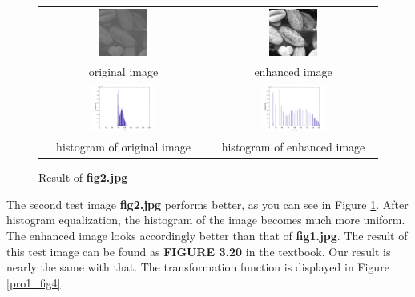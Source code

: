 \documentclass[11pt,a4paper]{article}
\begin{document}
\begin{figure}[!htbp]
	\centering
	\begin{tabular}{cc} 
		\includegraphics[width=0.3\textwidth]{pro1/fig2_origin}&
		\includegraphics[width=0.3\textwidth]{pro1/fig2_enhanced} \\
		original image & enhanced image\\
		\includegraphics[width=0.4\textwidth]{pro1/fig2_originhist} &
		\includegraphics[width=0.4\textwidth]{pro1/fig2_enhancehist}\\
		histogram of original image & histogram of enhanced image
	\end{tabular}
	\caption{Result of \textbf{fig2.jpg}}
	\label{pro1_fig3}
\end{figure}

The second test image \textbf{fig2.jpg} performs better, as you can see in Figure \ref{pro1_fig3}. 
After histogram equalization, the histogram of the image becomes much more uniform. The enhanced 
image looks accordingly better than that of \textbf{fig1.jpg}. The result of this test image can 
be found as \textbf{FIGURE 3.20} in the textbook. Our result is nearly the same with that. The transformation
 function is displayed in Figure \ref{pro1_fig4}.
\end{document}
